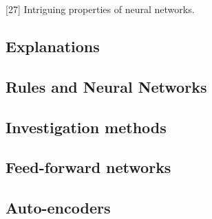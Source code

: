 [27] Intriguing properties of neural networks.

\subsection{Explanations}





\subsection{Rules and Neural Networks}





\subsection{Investigation methods}



\subsection{Feed-forward networks}








\subsection{Auto-encoders}



